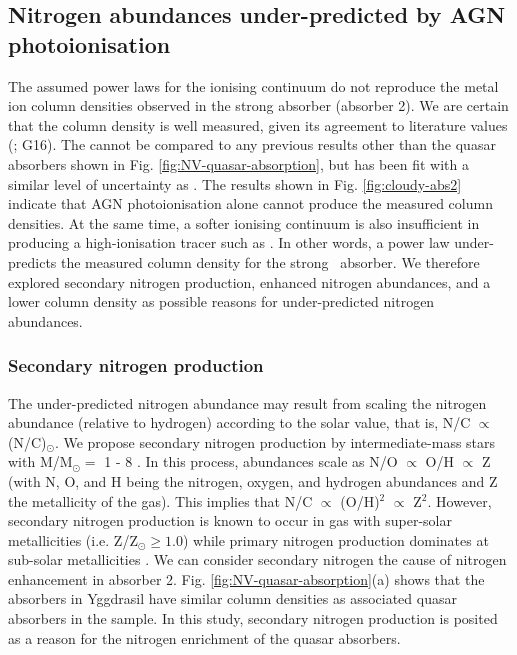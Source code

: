 \subsection{Nitrogen abundances under-predicted by AGN photoionisation}

The assumed power laws for the ionising continuum do not reproduce the metal ion column densities observed in the strong absorber (absorber 2). We are certain that the  column density is well measured, given its agreement to literature values (\citealp{jarvis2003}; G16). The  cannot be compared to any previous results other than the quasar absorbers shown in Fig. \ref{fig:NV-quasar-absorption}, but has been fit with a similar level of uncertainty as . The results shown in Fig. \ref{fig:cloudy-abs2} indicate that AGN photoionisation alone cannot produce the measured  column densities. At the same time, a softer ionising continuum is also insufficient in producing a high-ionisation tracer such as . In other words, a power law under-predicts the measured  column density for the strong \lya~absorber. We therefore explored secondary nitrogen production, enhanced nitrogen abundances, and a lower  column density as possible reasons for under-predicted nitrogen abundances. 

\subsubsection{Secondary nitrogen production}

The under-predicted nitrogen abundance may result from scaling the nitrogen abundance (relative to hydrogen) according to the solar value, that is, N/C $\propto$ (N/C)$_\odot.$ We propose secondary nitrogen production by intermediate-mass stars with M/M$_\odot=$ 1 - 8 \citep[e.g.][]{henry2000}. In this process, abundances scale as N/O $\propto$ O/H $\propto$ Z (with N, O, and H being the nitrogen, oxygen, and hydrogen abundances and Z the metallicity of the gas). This implies that N/C $\propto$ (O/H)$^2$ $\propto$ Z$^2.$ However, secondary nitrogen production is known to occur in gas with super-solar metallicities (i.e. Z/Z$_\odot \geq 1.0$) while primary nitrogen production dominates at sub-solar metallicities \citep[e.g.][]{Hamann&Ferland1993}. We can consider secondary nitrogen the cause of nitrogen enhancement in absorber 2. Fig. \ref{fig:NV-quasar-absorption}(a) shows that the absorbers in Yggdrasil have similar column densities as associated quasar absorbers in the \citet{fechner2009} sample. In this study, secondary nitrogen production is posited as a reason for the nitrogen enrichment of the quasar absorbers.  

